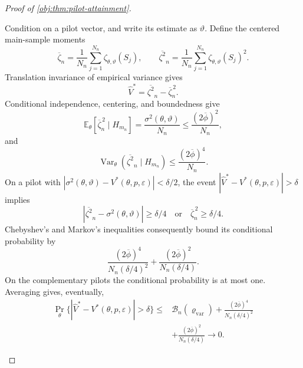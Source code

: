 \begin{proof}[Proof of \cref{obj:thm:pilot-attainment}]
\begin{enumerate}
Condition on a pilot vector, and write its estimate as \(\vartheta\). Define the centered main-sample moments
\[
\overline\zeta_n
=\frac1{N_n}\sum_{j=1}^{N_n}\zeta_{\theta,\vartheta}(S_j),
\qquad
\overline{\zeta^2}_n
=\frac1{N_n}\sum_{j=1}^{N_n}\zeta_{\theta,\vartheta}(S_j)^2.
\]
Translation invariance of empirical variance gives
\[
\widehat V^*=\overline{\zeta^2}_n-\overline\zeta_n^{\,2}.
\]
Conditional independence, centering, and boundedness give
\[
\mathbb E_\theta[\overline\zeta_n^{\,2}\mid H_{m_n}]
=\frac{\sigma^2(\theta,\vartheta)}{N_n}
\le\frac{(2\overline\phi)^2}{N_n},
\]
and
\[
\operatorname{Var}_\theta(\overline{\zeta^2}_n\mid H_{m_n})
\le\frac{(2\overline\phi)^4}{N_n}.
\]
On a pilot with
\(|\sigma^2(\theta,\vartheta)-V^*(\theta,p,\varepsilon)|<\delta/2\),
the event \(|\widehat V^*-V^*(\theta,p,\varepsilon)|>\delta\) implies
\[
|\overline{\zeta^2}_n-\sigma^2(\theta,\vartheta)|\ge\delta/4
\quad\text{or}\quad
\overline\zeta_n^{\,2}\ge\delta/4.
\]
Chebyshev's and Markov's inequalities consequently bound its conditional probability by
\[
\frac{(2\overline\phi)^4}{N_n(\delta/4)^2}
+\frac{(2\overline\phi)^2}{N_n(\delta/4)}.
\]
On the complementary pilots the conditional probability is at most one. Averaging gives, eventually,
\[
\begin{aligned}
\Pr_\theta\{|\widehat V^*-V^*(\theta,p,\varepsilon)|>\delta\}
\le{}&
\mathcal B_n(\varrho_{\mathrm{var}})
+\frac{(2\overline\phi)^4}{N_n(\delta/4)^2}\\
&+\frac{(2\overline\phi)^2}{N_n(\delta/4)}
\longrightarrow0.
\end{aligned}
\]


\end{enumerate}
\end{proof}
